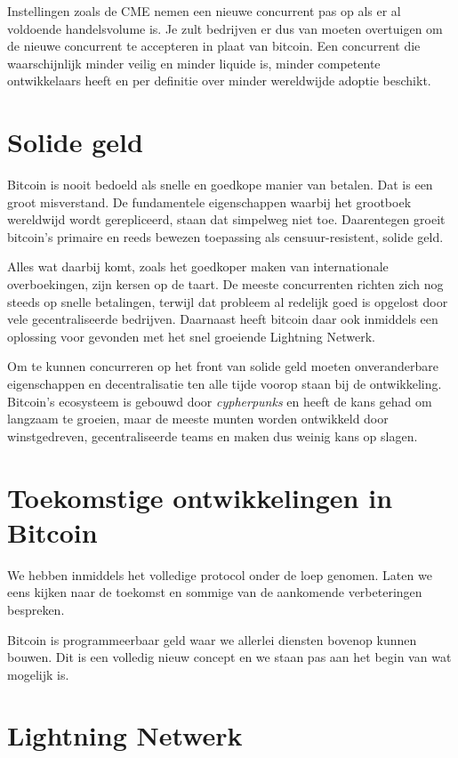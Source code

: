 \documentclass[smalldemyvopaper,11pt,twoside,onecolumn,openright,extrafontsizes]{memoir}
\begin{document}
Instellingen zoals de CME nemen een nieuwe concurrent pas op als er al voldoende handelsvolume is. Je zult bedrijven er dus van moeten overtuigen om de nieuwe concurrent te accepteren in plaat van bitcoin. Een concurrent die waarschijnlijk minder veilig en minder liquide is, minder competente ontwikkelaars heeft en per definitie over minder wereldwijde adoptie beschikt. 

\section{Solide geld}

Bitcoin is nooit bedoeld als snelle en goedkope manier van betalen. Dat is een groot misverstand. De fundamentele eigenschappen waarbij het grootboek wereldwijd wordt gerepliceerd, staan dat simpelweg niet toe. Daarentegen groeit bitcoin's primaire en reeds bewezen toepassing als censuur-resistent, solide geld. 

Alles wat daarbij komt, zoals het goedkoper maken van internationale overboekingen, zijn kersen op de taart. De meeste concurrenten richten zich nog steeds op snelle betalingen, terwijl dat probleem al redelijk goed is opgelost door vele gecentraliseerde bedrijven. Daarnaast heeft bitcoin daar ook inmiddels een oplossing voor gevonden met het snel groeiende Lightning Netwerk. 

Om te kunnen concurreren op het front van solide geld moeten onveranderbare eigenschappen en decentralisatie ten alle tijde voorop staan bij de ontwikkeling. Bitcoin's ecosysteem is gebouwd door \textit{cypherpunks} en heeft de kans gehad om langzaam te groeien, maar de meeste munten worden ontwikkeld door winstgedreven, gecentraliseerde teams en maken dus weinig kans op slagen.   

\newpage
\section{Toekomstige ontwikkelingen in Bitcoin}

We hebben inmiddels het volledige protocol onder de loep genomen. Laten we eens kijken naar de toekomst en sommige van de aankomende verbeteringen bespreken.

Bitcoin is programmeerbaar geld waar we allerlei diensten bovenop kunnen bouwen. Dit is een volledig nieuw concept en we staan pas aan het begin van wat mogelijk is.

\section{Lightning Netwerk}
\end{document}
